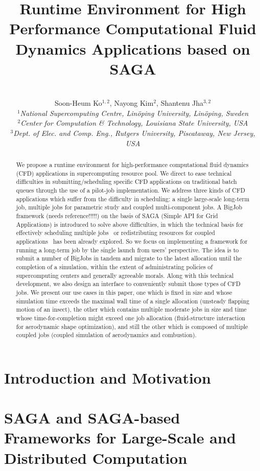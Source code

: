 \documentclass[10pt,conference]{IEEEtran}
\title{Runtime Environment for High Performance Computational Fluid Dynamics Applications based on SAGA}
\author{
 ~\\[-2em]
 Soon-Heum Ko$^{1,2}$, Nayong Kim$^{2}$, Shantenu Jha$^{3,2}$\\
 \small{\emph{$^{1}$National Supercomputing Centre, Lin\"{o}ping University, Lin\"{o}ping, Sweden}}\\
 \small{\emph{$^{2}$Center for Computation \& Technology, Louisiana State University, USA}}\\
 \small{\emph{$^{3}$Dept. of Elec. and Comp. Eng., Rutgers University, Piscataway, New Jersey, USA}}\\
}
\newcommand{\up}{\vspace*{-1em}}
\begin{document}
\maketitle

\begin{abstract}
We propose a runtime environment for high-performance computational
fluid dynamics (CFD) applications in supercomputing resource pool.
We direct to ease technical difficulties in submitting/scheduling
specific CFD applications on traditional batch queues through the use
of a pilot-job implementation. We address three kinds of CFD applications
which suffer from the difficulty in scheduling: a single large-scale
long-term job, multiple jobs for parametric study and coupled multi-component
jobs. A BigJob framework (needs reference!!!!!) on the basis of SAGA 
(Simple API for Grid Applications) is introduced to solve above difficulties,
in which the technical basis for effectively scheduling multiple jobs~\cite{SAGA_Thota}
or redistributing resources for coupled applications~\cite{CCGrid_Hybrid} 
has been already explored. So we focus on implementing a framework for running
a long-term job by the single launch from users' perspective. The idea is to
submit a number of BigJobs in tandem and migrate to the latest allocation
until the completion of a simulation, within the extent of administrating
policies of supercomputing centers and generally agreeable morals. Along with 
this technical development, we also design an interface to conveniently submit
those types of CFD jobs. We present our use cases in this paper, one which is
fixed in size and whose simulation time exceeds the maximal wall time of a single allocation 
(unsteady flapping motion of an insect), the other which contains multiple moderate jobs
in size and time whose time-for-completion might exceed one job allocation 
(fluid-structure interaction for aerodynamic shape optimization), and
still the other which is composed of multiple coupled jobs (coupled simulation of
aerodynamics and combustion).
\end{abstract}
\up\up

\section{Introduction and Motivation}

\section{SAGA and SAGA-based Frameworks for Large-Scale and Distributed Computation}
\end{document}
